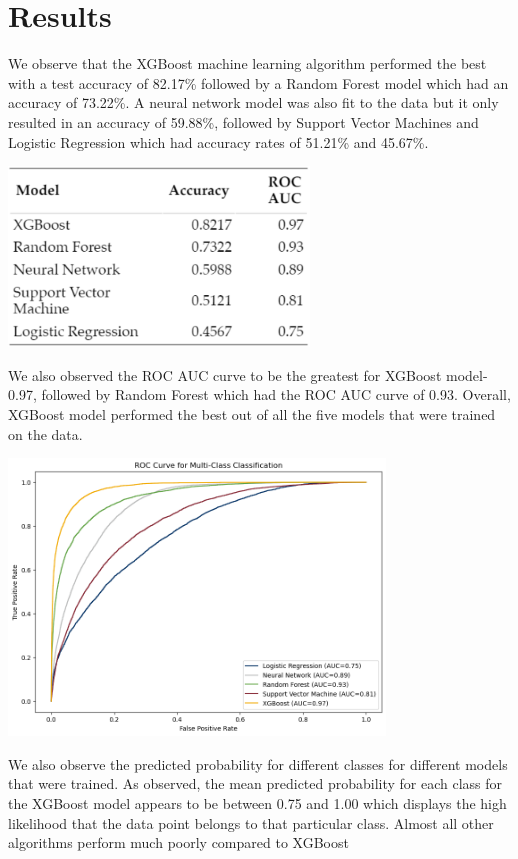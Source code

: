 \documentclass[
  article,
  nofooter]{jss}
\begin{document}
\section{Results}\label{results}

We observe that the XGBoost machine learning algorithm performed the
best with a test accuracy of 82.17\% followed by a Random Forest model
which had an accuracy of 73.22\%. A neural network model was also fit to
the data but it only resulted in an accuracy of 59.88\%, followed by
Support Vector Machines and Logistic Regression which had accuracy rates
of 51.21\% and 45.67\%.

\begin{center}
\includegraphics[width=0.6\textwidth,height=\textheight]{imgs/Screenshot.png}
\end{center}

We also observed the ROC AUC curve to be the greatest for XGBoost
model-0.97, followed by Random Forest which had the ROC AUC curve of
0.93. Overall, XGBoost model performed the best out of all the five
models that were trained on the data.

\begin{center}
\includegraphics[width=0.75\textwidth,height=\textheight]{imgs/roc-auc.png}
\end{center}

We also observe the predicted probability for different classes for
different models that were trained. As observed, the mean predicted
probability for each class for the XGBoost model appears to be between
0.75 and 1.00 which displays the high likelihood that the data point
belongs to that particular class. Almost all other algorithms perform
much poorly compared to XGBoost
\end{document}
